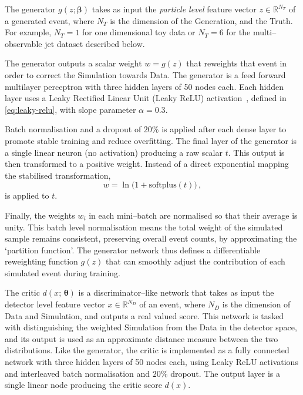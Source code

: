 {{        The generator $g(z;\boldsymbol{\beta})$ takes as input the \emph{particle level} feature vector $z \in \mathbb{R}^{N_T}$ of a generated event, where \(N_T\) is the dimension of the Generation, and the Truth.
        For example, $N_T=1$ for one dimensional toy data or $N_T=6$ for the multi--observable jet dataset described below.
        
        The generator outputs a scalar weight $w=g(z)$ that reweights that event in order to correct the Simulation towards Data.
        The generator is a feed forward multilayer perceptron with three hidden layers of 50 nodes each.
        Each hidden layer uses a Leaky Rectified Linear Unit (Leaky ReLU) activation~\cite{Maas2013RectifierModels}, defined in \cref{eq:leaky-relu}, with slope parameter \(\alpha = 0.3.\)
        
        Batch normalisation and a dropout of \(20\%\) is applied after each dense layer to promote stable training and reduce overfitting.
        The final layer of the generator is a single linear neuron (no activation) producing a raw scalar $t$.
        This output is then transformed to a positive weight.
        Instead of a direct exponential mapping the stabilised transformation,
        \[ 
            w = \ln\Big(1 + \text{softplus}(t)\Big)\,,
        \]
        is applied to \(t\).
        
         Finally, the weights ${w_i}$ in each mini--batch are normalised so that their average is unity.
         This batch level normalisation means the total weight of the simulated sample remains consistent, preserving overall event counts, by approximating the `partition function'.
         The generator network thus defines a differentiable reweighting function $g(z)$ that can smoothly adjust the contribution of each simulated event during training.

        The critic $d(x;\,\boldsymbol{\theta})$ is a discriminator--like network that takes as input the detector level feature vector $x \in \mathbb{R}^{N_D}$ of an event, where \(N_D\) is the dimension of Data and Simulation, and outputs a real valued score.
        This network is tasked with distinguishing the weighted Simulation from the Data in the detector space, and its output is used as an approximate distance measure between the two distributions.
        Like the generator, the critic is implemented as a fully connected network with three hidden layers of 50 nodes each, using Leaky ReLU activations and interleaved batch normalisation and \(20\%\) dropout.
        The output layer is a single linear node producing the critic score $d(x)$.
        
}}
